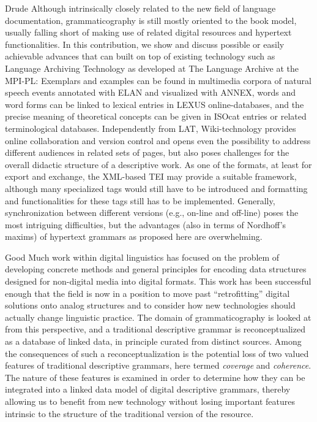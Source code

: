 Drude
Although intrinsically closely related to the new field of language documentation, grammaticography is still mostly oriented to the book model, usually falling short of making use of related digital resources and hypertext functionalities. In this contribution, we show and discuss possible or easily achievable advances that can built on top of existing technology such as Language Archiving Technology as developed at The Language Archive at the MPI-PL: Exemplars and examples can be found in multimedia corpora of natural speech events annotated with ELAN and visualized with ANNEX, words and word forms can be linked to lexical entries in LEXUS online-databases, and the precise meaning of theoretical concepts can be given in ISOcat entries or related terminological databases. Independently from LAT, Wiki-technology provides online collaboration and version control and opens even the possibility to address different audiences in related sets of pages, but also poses challenges for the overall didactic structure of a descriptive work. As one of the formats, at least for export and exchange, the XML-based TEI may provide a suitable framework, although many specialized tags would still have to be introduced and formatting and functionalities for these tags still has to be implemented. Generally, synchronization between different versions (e.g., on-line and off-line) poses the most intriguing difficulties, but the advantages (also in terms of Nordhoff's maxims) of hypertext grammars as proposed here are overwhelming.

Good
Much work within digital linguistics has focused on the problem of developing
concrete methods and general principles for encoding data structures designed
for non-digital media into digital formats. This work has been successful enough
that the field is now in a position to move past ``retrofitting'' digital
solutions onto analog structures and to consider how new technologies should
actually change linguistic practice. The domain of grammaticography is looked at
from this perspective, and a traditional descriptive grammar is reconceptualized
as a database of linked data, in principle curated from distinct sources. Among
the consequences of such a reconceptualization is the potential loss of two
valued features of traditional descriptive grammars, here termed \emph{coverage}
and \emph{coherence}. The nature of these features is examined in order to
determine how they can be integrated into a linked data model of digital
descriptive grammars, thereby allowing us to benefit from new technology without
losing important features intrinsic to the structure of the traditional version
of the resource.

